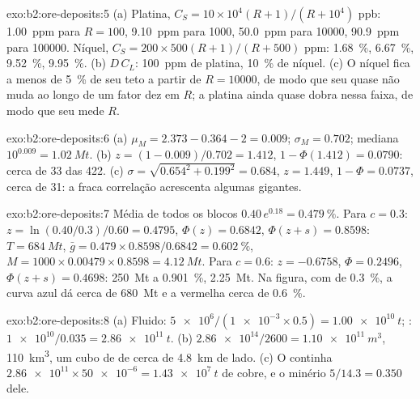 \begin{solution}{exo:b2:ore-deposits:5}
(a) Platina, $C_S = 10 \times 10^4 (R + 1)/(R + 10^4)$ ppb: \qty{1.00}{ppm} para $R = 100$,
\qty{9.10}{ppm} para \num{1000}, \qty{50.0}{ppm} para \num{10000}, \qty{90.9}{ppm} para \num{100000}.
Níquel, $C_S = 200 \times 500 (R + 1)/(R + 500)$ ppm: \qty{1.68}{\percent}, \qty{6.67}{\percent},
\qty{9.52}{\percent}, \qty{9.95}{\percent}. (b) $D\,C_L$: \qty{100}{ppm} de platina,
\qty{10}{\percent} de níquel. (c) O níquel fica a menos de \qty{5}{\percent} de seu teto a partir de
$R = \num{10000}$, de modo que seu  quase não muda ao longo de um fator dez em $R$; a platina ainda
quase dobra nessa faixa, de modo que seu  mede $R$.
\end{solution}

\begin{solution}{exo:b2:ore-deposits:6}
(a) $\mu_M = 2.373 - 0.364 - 2 = 0.009$; $\sigma_M = 0.702$; mediana $10^{0.009} = \qty{1.02}{Mt}$.
(b) $z = (1 - 0.009)/0.702 = 1.412$, $1 - \Phi(1.412) = 0.0790$: cerca de 33  das 422.
(c) $\sigma = \sqrt{0.654^2 + 0.199^2} = 0.684$, $z = 1.449$, $1 - \Phi = 0.0737$, cerca de 31: a
fraca correlação acrescenta algumas gigantes.
\end{solution}

\begin{solution}{exo:b2:ore-deposits:7}
Média de todos os blocos $0.40\,e^{0.18} = \qty{0.479}{\percent}$. Para $c = 0.3$: $z = \ln(0.40/0.3)/0.60 =
0.4795$, $\Phi(z) = 0.6842$, $\Phi(z + s) = 0.8598$: $T = \qty{684}{Mt}$, $\bar g = 0.479 \times
0.8598/0.6842 = \qty{0.602}{\percent}$, $M = 1000 \times 0.00479 \times 0.8598 = \qty{4.12}{Mt}$.
Para $c = 0.6$: $z = -0.6758$, $\Phi = 0.2496$, $\Phi(z + s) = 0.4698$: \qty{250}{Mt} a
\qty{0.901}{\percent}, \qty{2.25}{Mt}. Na figura, com  de \qty{0.3}{\percent}, a curva azul
dá cerca de \qty{680}{Mt} e a vermelha cerca de \qty{0.6}{\percent}.
\end{solution}

\begin{solution}{exo:b2:ore-deposits:8}
(a) Fluido: $\num{5e6}/(\num{1e-3} \times 0.5) = \qty{1.00e10}{t}$; : $\num{1e10}/0.035 =
\qty{2.86e11}{t}$. (b) $\num{2.86e14}/2600 = \qty{1.10e11}{m^3}$, \qty{110}{km^3}, um cubo de 
de cerca de \qty{4.8}{km} de lado. (c) O  continha $\num{2.86e11}
\times \num{50e-6} = \qty{1.43e7}{t}$ de cobre, e o minério $5/14.3 = 0.350$ dele.
\end{solution}

